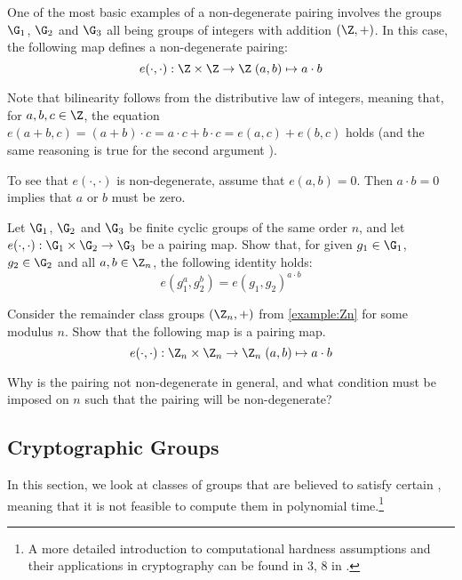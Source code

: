 \begin{example}
\label{example:integer_addition_pairing}
One of the most basic examples of a non-degenerate pairing involves the groups $\G_1$, $\G_2$ and $\G_3$ all being groups of integers with addition $(\Z,+)$. In this case, the following map defines a non-degenerate pairing:
\begin{equation}
e(\cdot,\cdot): \Z \times \Z \to \Z \; (a,b)\mapsto a\cdot b
\end{equation}

Note that bilinearity follows from the distributive law of integers, meaning that, for $a,b,c\in \Z$, the equation $e(a+b,c)=(a+b)\cdot c = a\cdot c + b\cdot c = e(a,c)+ e(b,c)$ holds (and the same reasoning is true for the second argument ).

To see that $e(\cdot,\cdot)$ is non-degenerate, assume that $e(a,b)=0$. Then $a\cdot b =0$ implies that $a$ or $b$ must be zero.
\end{example}
\begin{exercise}
\label{ex:pairing-arithmetics} Let $\G_1$, $\G_2$ and $\G_3$ be finite cyclic groups of the same order $n$, and let $e(\cdot,\cdot): \G_1 \times \G_2 \to \G_3$ be a pairing map. Show that, for given $g_1\in \G_1$, $g_2\in \G_2$ and all $a,b\in \Z_n$, the following identity holds:
\begin{equation}
e(g_1^a, g_2^b) = e(g_1,g_2)^{a\cdot b}
\end{equation}
\end{exercise}
\begin{exercise} Consider the remainder class groups $(\Z_n,+)$ from \examplename{} \ref{example:Zn} for some modulus $n$. Show that the following map is a pairing map. 
\begin{equation}
e(\cdot,\cdot): \Z_n \times \Z_n \to \Z_n \; (a,b)\mapsto a\cdot b
\end{equation}

Why is the pairing not non-degenerate in general, and what condition must be imposed on $n$ such that the pairing will be non-degenerate?
\end{exercise}

\subsection{Cryptographic Groups}
\label{crypto_groups} In this section, we look at classes of groups that are believed to satisfy certain , meaning that it is not feasible to compute them in polynomial time.\footnote{A more detailed introduction to computational hardness assumptions and their applications in cryptography can be found in \chaptname{} 3, \secname{} 8 in \cite{katz-2007}.}

